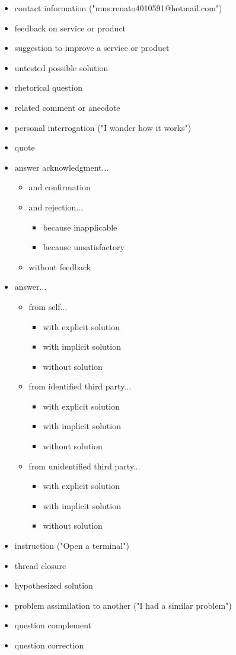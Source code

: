 \documentclass[11pt]{article}
\begin{document}
\begin{itemize}
	\item contact information ("mns:renato4010591@hotmail.com")
	\item feedback on service or product
	\item suggestion to improve a service or product
	\item untested possible solution
	\item rhetorical question
	\item related comment or anecdote
	\item personal interrogation ("I wonder how it works")
	\item quote
	\item answer acknowledgment...
		\begin{itemize}
			\item and confirmation
			\item and rejection...
			\begin{itemize}
				\item because inapplicable
				\item because unsatisfactory
			\end{itemize}
			\item without feedback
		\end{itemize}
	\item answer...
		\begin{itemize}
			\item from self...
				\begin{itemize}
					\item with explicit solution
					\item with implicit solution
					\item without solution
				\end{itemize}
			\item from identified third party...
				\begin{itemize}
					\item with explicit solution
					\item with implicit solution
					\item without solution
				\end{itemize}
			\item from unidentified third party...
				\begin{itemize}
					\item with explicit solution
					\item with implicit solution
					\item without solution
				\end{itemize}
		\end{itemize}
	\item instruction ("Open a terminal")
	\item thread closure
	\item hypothesized solution
	\item problem assimilation to another ("I had a similar problem")
	\item question complement
	\item question correction
\end{itemize}
\end{document}
